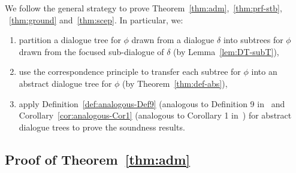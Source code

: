 We follow the general strategy to prove Theorem~\ref{thm:adm},~\ref{thm:prf-stb}, ~\ref{thm:ground} and~\ref{thm:scep}. In particular, we:

\begin{enumerate}
    \item partition a dialogue tree for $\phi$ drawn from a dialogue $\delta$ into subtrees for $\phi$ drawn from the focused sub-dialogue of $\delta$ (by Lemma~\ref{lem:DT-subT}),
    \item use the correspondence principle to transfer each subtree for $\phi$ into an abstract dialogue tree for $\phi$ (by Theorem~\ref{thm:def-abs}),
    \item apply Definition~\ref{def:analogous-Def9} (analogous to Definition 9 in~\cite{loanho_2024} and Corollary~\ref{cor:analogous-Cor1} (analogous to Corollary 1 in~\cite{loanho_2024}) for abstract dialogue trees to prove the soundness results. 
\end{enumerate}


    



  
\subsection{Proof of Theorem~\ref{thm:adm}}

\thmcredulous*

